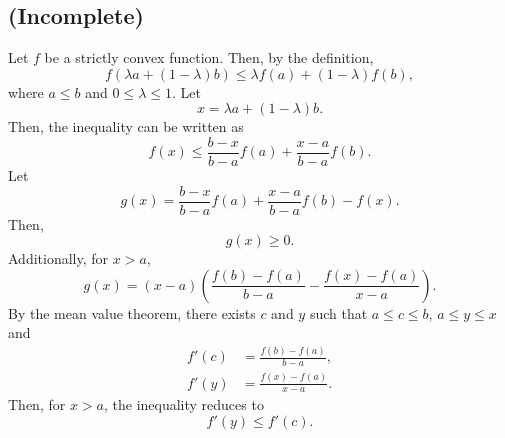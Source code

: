 \subsection{(Incomplete)}
Let $f$ be a strictly convex function.
Then, by the definition,
%
\begin{equation}
f \left( \lambda a + (1 - \lambda) b \right) \leq \lambda f(a) + (1 - \lambda) f(b),
\end{equation}
%
where $a \leq b$ and $0 \leq \lambda \leq 1$.
Let
%
\begin{equation}
x = \lambda a + (1 - \lambda) b.
\end{equation}
%
Then, the inequality can be written as
%
\begin{equation}
f(x) \leq \frac{b - x}{b - a} f(a) + \frac{x - a}{b - a} f(b).
\end{equation}
%
Let 
%
\begin{equation}
g(x) = \frac{b - x}{b - a} f(a) + \frac{x - a}{b - a} f(b) - f(x).
\end{equation}
%
Then,
%
\begin{equation}
g(x) \geq 0.
\end{equation}
%
Additionally, for $x > a$,
%
\begin{equation}
g(x) = (x - a) \left( \frac{f(b) - f(a)}{b - a} - \frac{f(x) - f(a)}{x - a} \right).
\end{equation}
%
By the mean value theorem, there exists $c$ and $y$ such that $a \leq c \leq b$, $a \leq y \leq x$ and
%
\begin{equation}
\begin{aligned}
f'(c) &= \frac{f(b) - f(a)}{b - a}, \\
f'(y) &= \frac{f(x) - f(a)}{x - a}.
\end{aligned}
\end{equation}
%
Then, for $x > a$, the inequality reduces to
%
\begin{equation}
f'(y) \leq f'(c). 
\end{equation}
%



